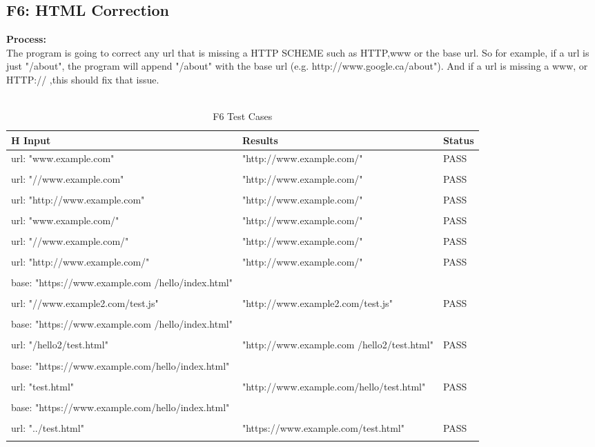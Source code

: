 \documentclass[12pt, titlepage]{article}
\begin{document}
\subsection{F6: HTML Correction}
\textbf{Process:}\\
The program is going to correct any url that is missing a HTTP SCHEME such as HTTP,www or the base url. So for example, if a url is just "/about", the program will append "/about" with the base url (e.g. http://www.google.ca/about"). And if a url is missing a www, or HTTP:// ,this should fix that issue.\\\\
\begin{table}[h!]
\centering
\begin{tabular}{ p{6cm}  p{8cm}  p{2cm} }{H}
	Input &Results & Status\\ \hline
	url: "www.example.com" &"http://www.example.com/" & PASS\\\\ \hline
	url: "//www.example.com" & "http://www.example.com/" & PASS\\\\ \hline
	url: "http://www.example.com" &"http://www.example.com/"& PASS\\\\ \hline
	url: "www.example.com/" & "http://www.example.com/"& PASS\\\\ \hline
	url: "//www.example.com/" & "http://www.example.com/" & PASS\\\\ \hline
	url: "http://www.example.com/" &"http://www.example.com/" & PASS\\\\ \hline
	base: "https://www.example.com /hello/index.html"\\\\
	url: "//www.example2.com/test.js" &"http://www.example2.com/test.js" & PASS\\\\ \hline
	
	base: "https://www.example.com /hello/index.html"\\\\
	url: "/hello2/test.html" & "http://www.example.com /hello2/test.html" & PASS\\\\ \hline
	base: "https://www.example.com/hello/index.html"\\\\
	url: "test.html" &"http://www.example.com/hello/test.html"& PASS\\\\ \hline
	base: "https://www.example.com/hello/index.html"\\\\
	url: "../test.html" & "https://www.example.com/test.html"& PASS\\\\ \hline

	
	
\end{tabular}
\caption{F6 Test Cases}
\label{table:F6 Test Cases}
\end{table}
\end{document}
